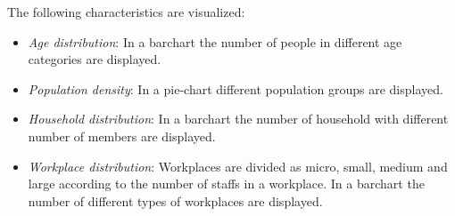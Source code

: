 \documentclass[a4paper]{article}
\begin{document}
The following characteristics are visualized:\\
\begin{itemize}
	\item \textit{Age distribution}: In a barchart the number of people in different age categories are displayed. 
    \item \textit{Population density}: In a pie-chart different population groups are displayed.
    \item \textit{Household distribution}: In a barchart the number of household with different number of members are displayed.
    \item \textit{Workplace distribution}: Workplaces are divided as micro, small, medium and large according to the number of staffs in a workplace. In a barchart the number of different types of workplaces are displayed.
\end{itemize}
\end{document}
